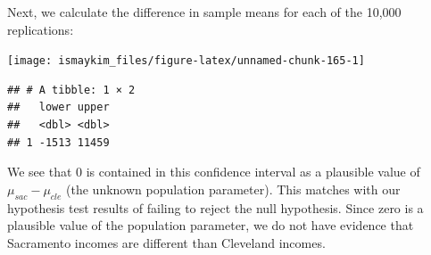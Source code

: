 \documentclass[]{tufte-book}
\newenvironment{Shaded}{\begin{snugshade}}{\end{snugshade}}
\newcommand{\KeywordTok}[1]{\textcolor[rgb]{0.13,0.29,0.53}{\textbf{{#1}}}}
\newcommand{\DataTypeTok}[1]{\textcolor[rgb]{0.13,0.29,0.53}{{#1}}}
\newcommand{\DecValTok}[1]{\textcolor[rgb]{0.00,0.00,0.81}{{#1}}}
\newcommand{\FloatTok}[1]{\textcolor[rgb]{0.00,0.00,0.81}{{#1}}}
\newcommand{\StringTok}[1]{\textcolor[rgb]{0.31,0.60,0.02}{{#1}}}
\newcommand{\NormalTok}[1]{{#1}}
\theoremstyle{definition}
\theoremstyle{definition}
\theoremstyle{remark}
\begin{document}
Next, we calculate the difference in sample means for each of the 10,000
replications:

\begin{Shaded}
\end{Shaded}

\begin{Shaded}
\end{Shaded}

\begin{center}\texttt{[image: ismaykim\_files/figure-latex/unnamed-chunk-165-1]} \end{center}

\begin{Shaded}
\end{Shaded}

\begin{verbatim}
## # A tibble: 1 × 2
##   lower upper
##   <dbl> <dbl>
## 1 -1513 11459
\end{verbatim}

We see that 0 is contained in this confidence interval as a plausible
value of \(\mu_{sac} - \mu_{cle}\) (the unknown population parameter).
This matches with our hypothesis test results of failing to reject the
null hypothesis. Since zero is a plausible value of the population
parameter, we do not have evidence that Sacramento incomes are different
than Cleveland incomes.
\end{document}
